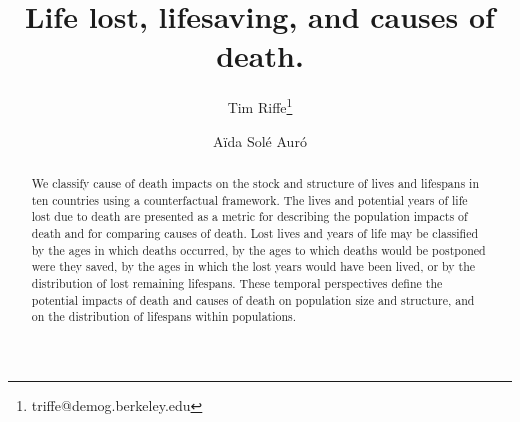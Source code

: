 \documentclass{article}
\begin{document}
\title{Life lost, lifesaving, and causes of death.}

\author[1]{Tim Riffe\thanks{triffe@demog.berkeley.edu}}
\author[2]{A{\"i}da Sol\'{e} Aur\'{o}}

\maketitle

%
\begin{abstract}
We classify cause of death impacts on the stock and structure of lives and
lifespans in ten countries using a counterfactual framework. The lives and potential years
of life lost due to death are presented as a metric for describing the population impacts of death and for comparing causes of
death. Lost lives and years of life may be classified by the ages in which
deaths occurred, by the ages to which deaths would be postponed were they saved, by the
ages in which the lost years would have been lived, or by the distribution of
lost remaining lifespans. These temporal perspectives define the
potential impacts of death and causes of death on population size and structure,
and on the distribution of lifespans within populations. 
\end{abstract}

%
\end{document}
